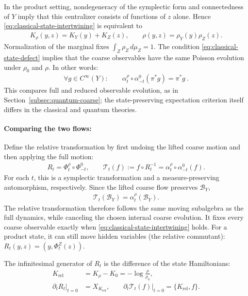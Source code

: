 \documentclass[a4paper,11pt]{article}
\theoremstyle{definition}
\newcommand{\mB}{\mathcal{B}}
\newcommand{\nn}{\nonumber}
\begin{document}
In the product setting, nondegeneracy of the symplectic form and connectedness of $Y$ imply that this centralizer consists of functions of $z$ alone. Hence \eqref{eq:classical-state-intertwining} is equivalent to
\begin{align}\label{eq:classical-product-state-closure}
    K_\rho(y,z)=K_Y(y)+K_Z(z),
    \qquad
    \rho(y,z)=\rho_Y(y)\rho_Z(z).
\end{align}
Normalization of the marginal fixes $\int_Z\rho_Z\,d\mu_Z=1$. The condition \eqref{eq:classical-state-defect} implies that the coarse observables have the same Poisson evolution under $\rho_0$ and $\rho$. In other words:
\begin{align}
    \forall g\in C^\infty(Y):\qquad \alpha^\rho_t\circ\alpha_{-t}^0(\pi^*g)=\pi^*g\ .
\end{align}
This compares full and reduced observable evolution, as in Section~\ref{subsec:quantum-coarse}; the state-preserving expectation criterion itself differs in the classical and quantum theories.

\paragraph{Comparing the two flows:}
Define the relative transformation by first undoing the lifted coarse motion and then applying the full motion:
\begin{align}\label{eq:classical-relative-transformation}
    R_t=\Phi_t^\rho\circ\Phi_{-t}^0,
    \qquad
    \mathcal T_t(f):=f\circ R_t^{-1}
    =\alpha_t^\rho\circ\alpha_{-t}^0(f).
\end{align}
For each $t$, this is a symplectic transformation and a measure-preserving automorphism, respectively. Since the lifted coarse flow preserves $\mB_Y$,
\begin{align}\label{eq:classical-relative-algebra-flow}
    \mathcal T_t(\mB_Y)=\alpha_t^\rho(\mB_Y).
\end{align}
The relative transformation therefore follows the same moving subalgebra as the full dynamics, while canceling the chosen internal coarse evolution. It fixes every coarse observable exactly when \eqref{eq:classical-state-intertwining} holds. For a product state, it can still move hidden variables (the relative commutant): $R_t(y,z)=(y,\Phi_t^Z(z))$.

The infinitesimal generator of $R_t$ is the difference of the state Hamiltonians:
\begin{align}\label{eq:classical-relative-Hamiltonian}
    K_{\mathrm{rel}}&=K_\rho-K_0=-\log\frac{\rho}{\rho_0},\nn\\
    \left.\partial_tR_t\right|_{t=0}&=X_{K_{\mathrm{rel}}},\qquad
    \left.\partial_t\mathcal T_t(f)\right|_{t=0}=\{K_{\mathrm{rel}},f\}.
\end{align}
\end{document}
